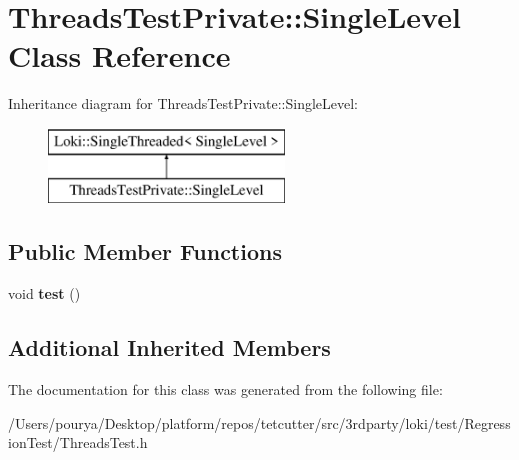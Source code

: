 \hypertarget{classThreadsTestPrivate_1_1SingleLevel}{}\section{Threads\+Test\+Private\+:\+:Single\+Level Class Reference}
\label{classThreadsTestPrivate_1_1SingleLevel}
Inheritance diagram for Threads\+Test\+Private\+:\+:Single\+Level\+:\begin{figure}[H]
\begin{center}
\leavevmode
\includegraphics[height=2.000000cm]{classThreadsTestPrivate_1_1SingleLevel}
\end{center}
\end{figure}
\subsection*{Public Member Functions}
\begin{DoxyCompactItemize}
\item 
\hypertarget{classThreadsTestPrivate_1_1SingleLevel_a8a517ed985ab1ca2973d7f4d778aa03e}{}void {\bfseries test} ()\label{classThreadsTestPrivate_1_1SingleLevel_a8a517ed985ab1ca2973d7f4d778aa03e}

\end{DoxyCompactItemize}
\subsection*{Additional Inherited Members}


The documentation for this class was generated from the following file\+:\begin{DoxyCompactItemize}
\item 
/\+Users/pourya/\+Desktop/platform/repos/tetcutter/src/3rdparty/loki/test/\+Regression\+Test/Threads\+Test.\+h\end{DoxyCompactItemize}
